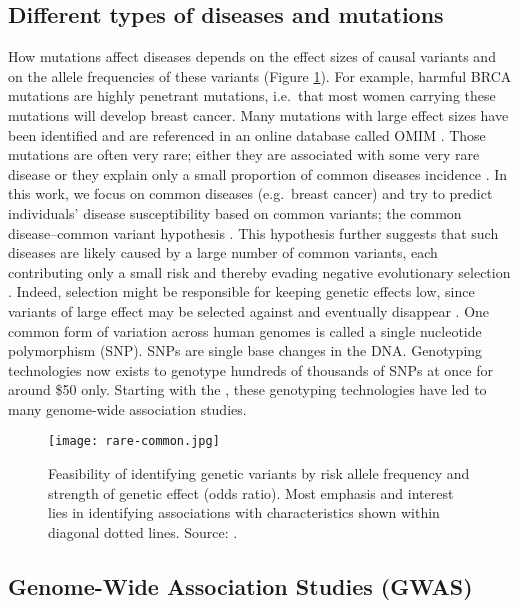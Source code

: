 \subsection{Different types of diseases and mutations}

How mutations affect diseases depends on the effect sizes of causal variants and on the allele frequencies of these variants (Figure \ref{fig:rare-common}).
For example, harmful BRCA mutations are highly penetrant mutations, i.e.\ that most women carrying these mutations will develop breast cancer. Many mutations with large effect sizes have been identified and are referenced in an online database called OMIM \cite[]{hamosh2005online}. 
Those mutations are often very rare; either they are associated with some very rare disease or they explain only a small proportion of common diseases incidence \cite[]{anglian2000prevalence}.
In this work, we focus on common diseases (e.g.\ breast cancer) and try to predict individuals' disease susceptibility based on common variants; the common disease--common variant hypothesis \cite[]{pritchard2002allelic}. This hypothesis further suggests that such diseases are likely caused by a large number of common variants, each contributing only a small risk and thereby evading negative evolutionary selection \cite[]{salari2012personalized}.
Indeed, selection might be responsible for keeping genetic effects low, since variants of large effect may be selected against and eventually disappear \cite[]{pritchard2002allelic}.
One common form of variation across human genomes is called a single nucleotide polymorphism (SNP). SNPs are single base changes in the DNA.
Genotyping technologies now exists to genotype hundreds of thousands of SNPs at once for around \$50 only. Starting with the \cite{wellcome2007genome}, these genotyping technologies have led to many genome-wide association studies.

\begin{figure}[htb]
\centerline{\texttt{[image: rare-common.jpg]}}
\caption{Feasibility of identifying genetic variants by risk allele frequency and strength of genetic effect (odds ratio). Most emphasis and interest lies
in identifying associations with characteristics shown within diagonal dotted
lines. Source: \cite{manolio2009finding}.}
\label{fig:rare-common}
\end{figure}

\subsection{Genome-Wide Association Studies (GWAS)}

